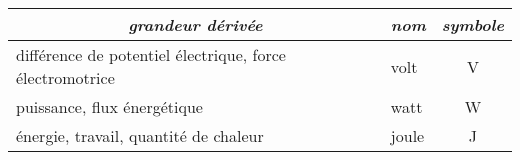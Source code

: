 \documentclass[french]{report}
\newcommand\centh[1]{\multicolumn{1}{c}{#1}}
\begin{document}
	\begin{tabular}{p{5cm}lc}
		\hline\hline
		\centh{\emph{grandeur dérivée}} & \centh{\emph{nom}} & \emph{symbole}
		\\ \hline
		différence de potentiel électrique, force électromotrice & volt  & V
		\\
		puissance, flux énergétique                              & watt  & W
		\\
		énergie, travail, quantité de chaleur                    & joule & J
		\\ \hline\hline
	\end{tabular}
\end{document}
